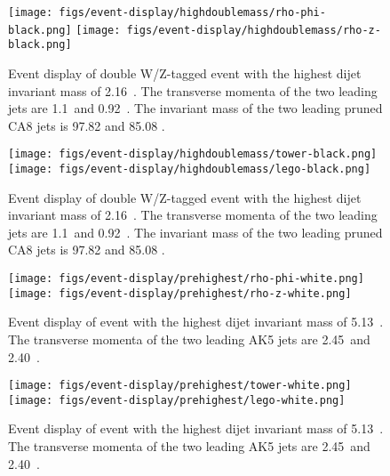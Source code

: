 \begin{figure}[htb]
\begin{center}
\texttt{[image: figs/event-display/highdoublemass/rho-phi-black.png]}
\texttt{[image: figs/event-display/highdoublemass/rho-z-black.png]}
\end{center}
\caption{Event display of double W/Z-tagged event with the highest dijet invariant mass of 2.16~\TeVcc .
The transverse momenta of the two leading jets are 1.1~\TeVcc and 0.92~\TeVcc .
The invariant mass of the two leading pruned CA8 jets is 97.82 \GeVcc and 85.08 \GeVcc .
}
\label{fig:eventdisplay3}
\end{figure}

\begin{figure}[htb]
\begin{center}
\texttt{[image: figs/event-display/highdoublemass/tower-black.png]}
\texttt{[image: figs/event-display/highdoublemass/lego-black.png]}
\end{center}
\caption{Event display of double W/Z-tagged event with the highest dijet invariant mass of 2.16~\TeVcc .
The transverse momenta of the two leading jets are 1.1~\TeVcc and 0.92~\TeVcc .
The invariant mass of the two leading pruned CA8 jets is 97.82 \GeVcc and 85.08 \GeVcc .
}
\label{fig:eventdisplay4}
\end{figure}

\begin{figure}[htb]
\begin{center}
\texttt{[image: figs/event-display/prehighest/rho-phi-white.png]}
\texttt{[image: figs/event-display/prehighest/rho-z-white.png]}
\end{center}
\caption{Event display of event with the highest dijet invariant mass of 5.13~\TeVcc .
The transverse momenta of the two leading AK5 jets are 2.45~\TeVcc and 2.40~\TeVcc .
}
\label{fig:eventdisplay11}
\end{figure}

\begin{figure}[htb]
\begin{center}
\texttt{[image: figs/event-display/prehighest/tower-white.png]}
\texttt{[image: figs/event-display/prehighest/lego-white.png]}
\end{center}
\caption{Event display of event with the highest dijet invariant mass of 5.13~\TeVcc .
The transverse momenta of the two leading AK5 jets are 2.45~\TeVcc and 2.40~\TeVcc .
}
\label{fig:eventdisplay12}
\end{figure}


